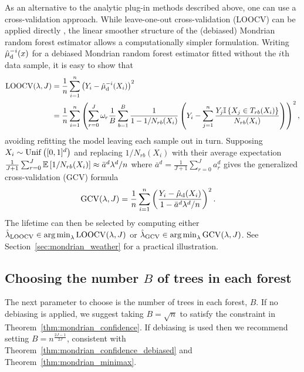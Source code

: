As an alternative to the analytic plug-in methods described above, one can use
a cross-validation approach. While leave-one-out cross-validation (LOOCV) can
be applied directly \citep{fan2020statistical},
the linear smoother structure of the (debiased) Mondrian
random forest estimator allows a computationally simpler formulation. Writing
$\hat\mu_{\mathrm{d}}^{-i}(x)$ for a debiased Mondrian random forest estimator fitted
without the $i$th data sample, it is easy to show that
%
\begin{align*}
  \operatorname{LOOCV}(\lambda, J)
  &=
  \frac{1}{n}
  \sum_{i=1}^{n}
  \left( Y_i - \hat\mu_{\mathrm{d}}^{-i}(X_i) \right)^2 \\
  &=
  \frac{1}{n}
  \sum_{i=1}^{n}
  \left(
    \sum_{r=0}^{J}
    \omega_r
    \frac{1}{B}
    \sum_{b=1}^{B}
    \frac{1}{1 - 1/N_{r b}(X_i)}
    \left( Y_i -
      \sum_{j=1}^{n}
      \frac{ Y_j \mathbb{I} \left\{ X_j \in T_{r b}(X_i) \right\}}
      {N_{r b}(X_i)}
    \right)
  \right)^{2},
\end{align*}
%
avoiding refitting the model leaving each sample out in turn.
Supposing $X_i \sim \operatorname{Unif}\big([0,1]^d\big)$ and
replacing $1/N_{r b}(X_i)$ with their average expectation
$ \frac{1}{J+1} \sum_{r=0}^{J} \mathbb{E} \left[ 1/N_{r b}(X_i) \right]
\approx \bar a^d \lambda^d / n$
where $\bar a^d = \frac{1}{J+1} \sum_{r=0}^{J} a_r^d$
gives the generalized cross-validation (GCV) formula
%
\begin{align}
  \label{eq:mondrian_gcv}
  \operatorname{GCV}(\lambda, J)
  &=
  \frac{1}{n}
  \sum_{i=1}^{n}
  \left(
    \frac{Y_i - \hat\mu_{\mathrm{d}}(X_i)}
    {1 - \bar a^d \lambda^d / n}
  \right)^2.
\end{align}
%
The lifetime can then be selected by computing
either $\hat\lambda_{\operatorname{LOOCV}} \in \operatorname*{arg\,min}_\lambda \operatorname{LOOCV}(\lambda, J)$
or $\hat\lambda_{\operatorname{GCV}} \in \operatorname*{arg\,min}_\lambda \operatorname{GCV}(\lambda, J)$.
See Section~\ref{sec:mondrian_weather} for a practical illustration.

\subsection{Choosing the number \texorpdfstring{$B$}{B} of trees
in each forest}%

The next parameter to choose is the number of trees in each forest, $B$.
If no debiasing is applied, we suggest taking
$B = \sqrt{n}$ to satisfy the constraint in
Theorem~\ref{thm:mondrian_confidence}.
If debiasing is used then we recommend setting
$B = n^{\frac{2J-1}{2J}}$, consistent with
Theorem~\ref{thm:mondrian_confidence_debiased}
and Theorem~\ref{thm:mondrian_minimax}.

